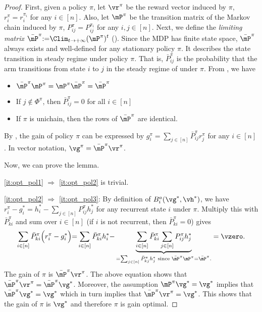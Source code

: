 \begin{proof}
    First, given a policy $\pi$, let $\vr^\pi$ be the reward vector induced by $\pi$, $r^\pi_i=r^{\pi_i}_i$ for any $i\in[n]$.
    Also, let $\mP^\pi$ be the transition matrix of the Markov chain induced by $\pi$, $P^\pi_{ij}=P^{\pi_i}_{ij}$ for any $i,j\in[n]$.
    Next, we define the \emph{limiting matrix} $\bar{\mP}^\pi{:=}\displaystyle\Clim_{t\to+\infty}{(\mP^\pi)^t}$ (\cite[Appendix~A.4]{puterman2014markov}). %
    Since the MDP has finite state space, $\bar{\mP}^\pi$ always exists and well-defined for any stationary policy $\pi$.
    It describes the state transition in steady regime under policy $\pi$.
    That is, $\bar{P}^\pi_{ij}$ is the probability that the arm transitions from state $i$ to $j$ in the steady regime of under $\pi$.
    From \cite[Section~A.4]{puterman2014markov}, we have
    \begin{itemize}
        \item $\bar{\mP}^\pi\mP^\pi =\mP^\pi\bar{\mP}^\pi =\bar{\mP}^\pi$
        \item If $j\notin\Phi^\pi$, then $\bar{P}^\pi_{ij}=0$ for all $i\in[n]$
        \item If $\pi$ is unichain, then the rows of $\bar{\mP}^\pi$ are identical.
    \end{itemize}
    By \cite[Theorem~8.2.6]{puterman2014markov}, the gain of policy $\pi$ can be expressed by $g^\pi_i=\sum_{j\in[n]}\bar{P}^\pi_{ij}r^{\pi}_j$ for any $i\in[n]$.
    In vector notation, $\vg^\pi=\bar{\mP}^\pi\vr^\pi$.

    Now, we can prove the lemma.

    \ref{it:opt_pol1} $\Rightarrow$ \ref{it:opt_pol2} is trivial.

    \ref{it:opt_pol2} $\Rightarrow$ \ref{it:opt_pol3}: By definition of $B_i^a(\vg^*,\vh^*)$, we have $r^{\pi}_i-g^*_i = h^*_i-\sum_{j\in[n]} P^{\pi}_{ij}h^*_j$ for any recurrent state $i$ under $\pi$.
    Multiply this with $\bar{P}^\pi_{ki}$ and sum over $i\in[n]$ (if $i$ is not recurrent, then $\bar{P}^\pi_{ki}=0$) gives
    \begin{align*}
        \sum_{i\in[n]} \bar{P}^\pi_{ki}\Big(r^{\pi}_i-g^*_i\Big) {=} \sum_{i\in[n]} \bar{P}^\pi_{ki}h^*_i {-} \underbrace{\sum_{i\in[n]} \bar{P}^\pi_{ki}\sum_{j\in[n]} P^{\pi}_{ij}h^*_j}_{=\sum_{j\in[n]} \bar{P}^\pi_{kj}h^*_j \text{ since $\bar{\mP}^\pi\mP^\pi{=}\bar{\mP}^\pi$.}}
        = \vzero.
    \end{align*}
    The gain of $\pi$ is $\bar{\mP}^\pi \vr^\pi$.
    The above equation shows that $\bar{\mP}^\pi\vr^\pi = \bar{\mP}^\pi\vg^*$. Moreover, the assumption  $\mP^\pi\vg^*=\vg^*$ implies that $\bar{\mP}^\pi\vg^*=\vg^*$ which in turn implies that $\bar{\mP}^\pi\vr^\pi=\vg^*$. This shows that the gain of $\pi$ is $\vg^*$ and therefore $\pi$ is gain optimal.


\end{proof}
